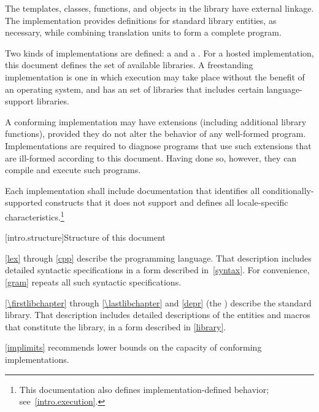 \pnum
The templates, classes, functions, and objects in the library have
external linkage. The implementation provides
definitions for standard library entities, as necessary, while combining
translation units to form a complete \Cpp  program.%

\pnum
Two kinds of implementations are defined: a  and a
. For a hosted implementation, this
document defines the set of available libraries. A freestanding
implementation is one in which execution may take place without the benefit of
an operating system, and has an  set of libraries that includes certain language-support
libraries.

\pnum
A conforming implementation may have extensions (including
additional library functions), provided they do not alter the
behavior of any well-formed program.
Implementations are required to diagnose programs that use such
extensions that are ill-formed according to this document.
Having done so, however, they can compile and execute such programs.

\pnum
Each implementation shall include documentation that identifies all
conditionally-supported constructs
that it does not support and defines all locale-specific characteristics.\footnote{This documentation also defines implementation-defined behavior;
see~\ref{intro.execution}.}%
%
%

[intro.structure]{Structure of this document}

\pnum
{}%
%
\ref{lex} through \ref{cpp} describe the \Cpp  programming
language. That description includes detailed syntactic specifications in
a form described in~\ref{syntax}. For convenience, \ref{gram}
repeats all such syntactic specifications.

\pnum
\ref{\firstlibchapter} through \ref{\lastlibchapter} and \ref{depr}
(the ) describe the \Cpp standard library.
That description includes detailed descriptions of the
entities and macros
that constitute the library, in a form described in \ref{library}.

\pnum
\ref{implimits} recommends lower bounds on the capacity of conforming
implementations.

